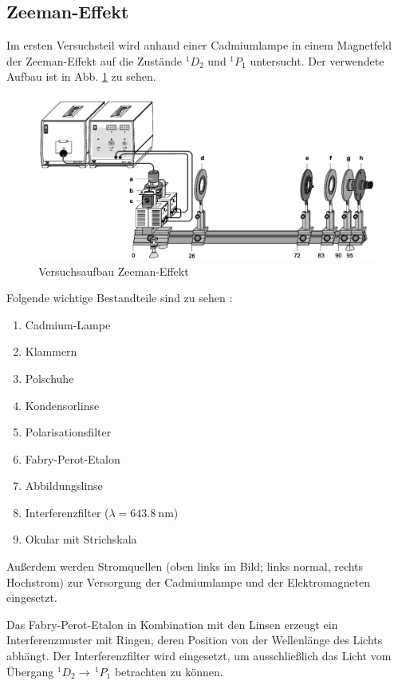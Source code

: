 \documentclass{article}
\begin{document}
\begin{multicols}{2}
\section{Zeeman-Effekt}
Im ersten Versuchsteil wird anhand einer Cadmiumlampe in einem Magnetfeld der Zeeman-Effekt auf die Zustände $^1D_2$ und $^1P_1$ untersucht.
Der verwendete Aufbau ist in Abb. \ref{fig:zeeman-aufbau} zu sehen.
\begin{figure}[H]
  \centering
  \includegraphics[width=\linewidth]{zeeman-aufbau}
  \caption{Versuchsaufbau Zeeman-Effekt \cite{Leybold}}
  \label{fig:zeeman-aufbau}
\end{figure}
Folgende wichtige Bestandteile sind zu sehen \cite{Anleitung}:
\begin{enumerate}[label=\alph*.]
  \item Cadmium-Lampe
  \item Klammern
  \item Polschuhe
  \item Kondensorlinse
  \item Polarisationsfilter
  \item Fabry-Perot-Etalon
  \item Abbildungslinse
  \item Interferenzfilter ($\lambda=\SI{643.8}{\nm}$)
  \item Okular mit Strichskala
\end{enumerate}
Außerdem werden Stromquellen (oben links im Bild; links normal, rechts Hochstrom)
zur Versorgung der Cadmiumlampe und der Elektromagneten eingesetzt.

Das Fabry-Perot-Etalon in Kombination mit den Linsen erzeugt ein Interferenzmuster mit Ringen,
deren Position von der Wellenlänge des Lichts abhängt.
Der Interferenzfilter wird eingesetzt, um ausschließlich das Licht vom Übergang $^1D_2 \rightarrow\,^1P_1$ betrachten zu können.


\end{multicols}
\end{document}
